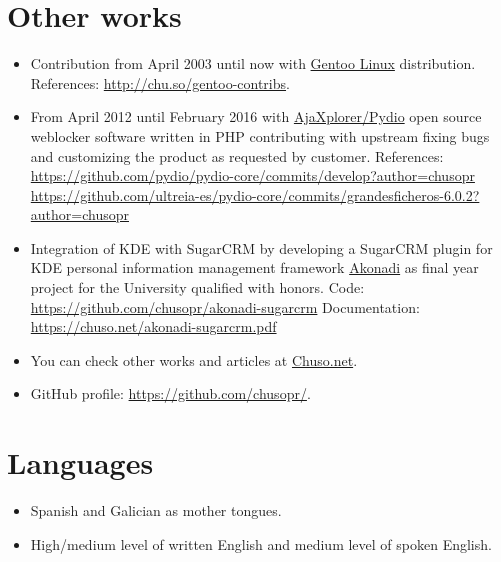 \documentclass[english]{simplecv}
\begin{document}
\section{Other works}

\begin{itemize}
\item Contribution from April 2003 until now with
\href{http://www.gentoo.org}{Gentoo Linux} distribution.\newline
References: \url{http://chu.so/gentoo-contribs}.
\item From April 2012 until February 2016 with
\href{http://ajaxplorer.info}{AjaXplorer/Pydio} open source weblocker software written in PHP contributing with upstream fixing bugs and customizing the product as requested by customer.\newline
References:\newline
\url{https://github.com/pydio/pydio-core/commits/develop?author=chusopr}\newline
\url{https://github.com/ultreia-es/pydio-core/commits/grandesficheros-6.0.2?author=chusopr}
\item Integration of KDE with SugarCRM by developing a SugarCRM plugin for KDE personal information management framework \href{https://community.kde.org/KDE_PIM/Akonadi}{Akonadi} as final year project for the University qualified with honors.\newline
Code: \url{https://github.com/chusopr/akonadi-sugarcrm}\newline
Documentation: \url{https://chuso.net/akonadi-sugarcrm.pdf}
\item You can check other works and articles at \href{http://chuso.net}{Chuso.net}.
\item GitHub profile: \url{https://github.com/chusopr/}.
\end{itemize}

\section{Languages}

\begin{itemize}
\item Spanish and Galician as mother tongues.
\item High/medium level of written English and medium level of spoken English.
\end{itemize}
\end{document}
